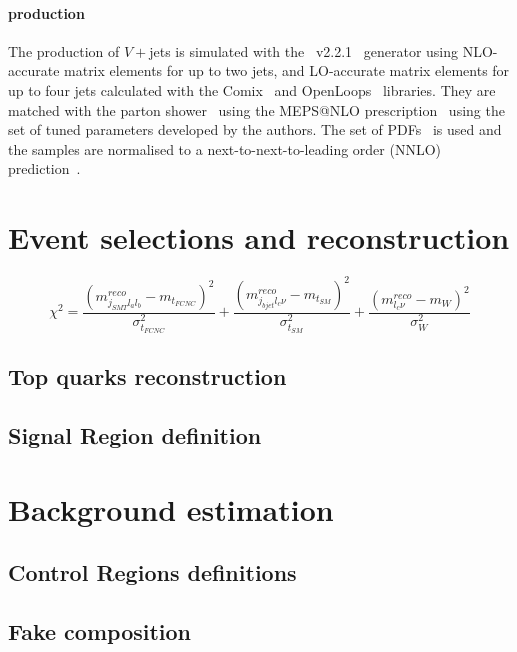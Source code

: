 \paragraph{\Zjets production}  
The production of $V+$jets is simulated with the
\sherpa~v2.2.1~\cite{Bothmann:2019yzt}
generator using NLO-accurate matrix elements for up to two jets, and LO-accurate matrix elements
for up to four jets calculated with the Comix~\cite{Gleisberg:2008fv}
and OpenLoops~\cite{Cascioli:2011va,Denner:2016kdg} libraries. They
are matched with the \sherpa parton shower~\cite{Schumann:2007mg} using the MEPS@NLO
prescription~\cite{Hoeche:2011fd,Hoeche:2012yf,Catani:2001cc,Hoeche:2009rj}
using the set of tuned parameters developed by the \sherpa authors.
The \nnpdfnnlo set of PDFs~\cite{Ball:2014uwa} is used and the samples
are normalised to a next-to-next-to-leading order (NNLO)
prediction~\cite{Anastasiou:2003ds}.





\clearpage
\section{Event selections and reconstruction}
\label{sec:selection}
\begin{equation}
\chi^2=\frac{  (m^{reco}_{j_{SMT}l_{a}l_{b}} -m_{t_{FCNC}})^2 }{\sigma^2_{t_{FCNC}}}   +\frac{  (m^{reco}_{j_{bjet}l_{c}\nu} -m_{t_{SM}})^2 }{\sigma^2_{t_{SM}}}+\frac{  (m^{reco}_{l_{c}\nu} -m_{W})^2 }{\sigma^2_{W}}
\end{equation}
\clearpage
\subsection {Top quarks reconstruction}
\clearpage
\subsection {Signal Region definition}


\clearpage
\section{Background estimation}
\label{sec:background}
\clearpage
\subsection {Control Regions definitions}

\clearpage
\subsection {Fake composition}



